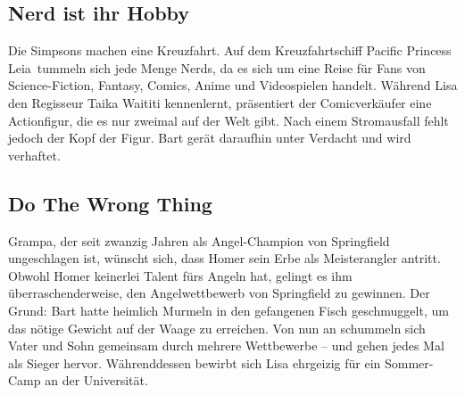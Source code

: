 
\subsection{Nerd ist ihr Hobby}
Die Simpsons machen eine Kreuzfahrt. Auf dem Kreuzfahrtschiff \glqq Pacific Princess Leia\grqq\ tummeln sich jede Menge Nerds, da es sich um eine Reise für Fans von Science-Fiction, Fantasy, Comics, Anime und Videospielen handelt. Während Lisa den Regisseur Taika Waititi kennenlernt, präsentiert der Comicverkäufer eine Actionfigur, die es nur zweimal auf der Welt gibt. Nach einem Stromausfall fehlt jedoch der Kopf der Figur. Bart gerät daraufhin unter Verdacht und wird verhaftet.


\subsection{Do The Wrong Thing}\label{35ABF01}
Grampa, der seit zwanzig Jahren als Angel-Champion von Springfield ungeschlagen ist, wünscht sich, dass Homer sein Erbe als Meisterangler antritt. Obwohl Homer keinerlei Talent fürs Angeln hat, gelingt es ihm überraschenderweise, den Angelwettbewerb von Springfield zu gewinnen. Der Grund: Bart hatte heimlich Murmeln in den gefangenen Fisch geschmuggelt, um das nötige Gewicht auf der Waage zu erreichen. Von nun an schummeln sich Vater und Sohn gemeinsam durch mehrere Wettbewerbe -- und gehen jedes Mal als Sieger hervor. Währenddessen bewirbt sich Lisa ehrgeizig für ein Sommer-Camp an der Universität.

